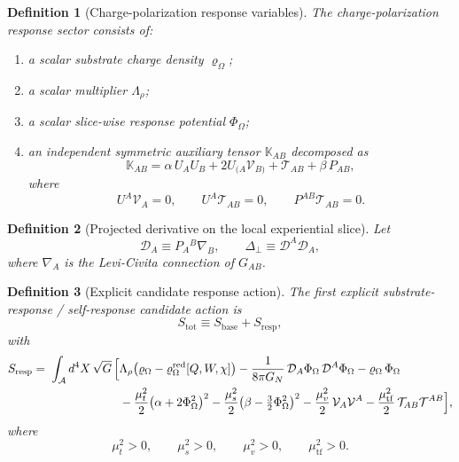\documentclass[11pt]{article}
\newcommand{\Sub}{\mathcal A}
\newcommand{\ProjSub}{P}
\newcommand{\SpatialD}{\mathcal D}
\newcommand{\LapPerp}{\Delta_\perp}
\newcommand{\AuxPol}{\mathbb K}
\newcommand{\FlowPot}{\Phi_\Omega}
\newcommand{\SourceDensity}{\varrho_\Omega}
\newcommand{\SourceDensityRed}{\varrho_\Omega^{\mathrm{red}}}
\newcommand{\SourceMult}{\Lambda_\rho}
\newcommand{\ResponseAction}{S_{\mathrm{resp}}}
\newcommand{\BaseAction}{S_{\mathrm{base}}}
\newcommand{\TotalAction}{S_{\mathrm{tot}}}
\newtheorem{definition}{Definition}
\begin{document}
\begin{definition}[Charge-polarization response variables]
\label{def:variables}
The \emph{charge-polarization response sector} consists of:
\begin{enumerate}
    \item a scalar substrate charge density \(\SourceDensity\);
    \item a scalar multiplier \(\SourceMult\);
    \item a scalar slice-wise response potential \(\FlowPot\);
    \item an independent symmetric auxiliary tensor \(\AuxPol_{AB}\) decomposed as
    \begin{equation}
    \AuxPol_{AB}
    =
    \alpha\,U_AU_B
    +2U_{(A}\mathcal V_{B)}
    +\mathcal T_{AB}
    +\beta\,\ProjSub_{AB},
    \label{eq:Kdecomp}
    \end{equation}
    where
    \begin{equation}
    U^A\mathcal V_A=0,
    \qquad
    U^A\mathcal T_{AB}=0,
    \qquad
    \ProjSub^{AB}\mathcal T_{AB}=0.
    \label{eq:TVcond}
    \end{equation}
\end{enumerate}
\end{definition}

\begin{definition}[Projected derivative on the local experiential slice]
\label{def:derivatives}
Let
\begin{equation}
\SpatialD_A\equiv \ProjSub_A{}^B\nabla_B,
\qquad
\LapPerp\equiv \SpatialD^A\SpatialD_A,
\label{eq:projderiv}
\end{equation}
where \(\nabla_A\) is the Levi-Civita connection of \(G_{AB}\).
\end{definition}

\begin{definition}[Explicit candidate response action]
\label{def:action}
The \emph{first explicit substrate-response / self-response candidate action} is
\begin{equation}
\TotalAction
\equiv
\BaseAction
+\ResponseAction,
\label{eq:Stot}
\end{equation}
with
\begin{align}
\ResponseAction
=\;
\int_{\Sub} d^4X\,\sqrt{G}\,
\Bigl[
&\SourceMult\bigl(\SourceDensity-\SourceDensityRed[Q,W,\chi]\bigr)
-\frac{1}{8\pi G_N}\,\SpatialD_A\FlowPot\,\SpatialD^A\FlowPot
-\SourceDensity\,\FlowPot
\nonumber\\
&-\frac{\mu_t^2}{2}\bigl(\alpha+2\FlowPot^2\bigr)^2
-\frac{\mu_s^2}{2}\bigl(\beta-\tfrac32\FlowPot^2\bigr)^2
-\frac{\mu_v^2}{2}\,\mathcal V_A\mathcal V^A
-\frac{\mu_{\mathrm{tf}}^2}{2}\,\mathcal T_{AB}\mathcal T^{AB}
\Bigr],
\label{eq:Sresp}
\end{align}
where
\begin{equation}
\mu_t^2>0,
\qquad
\mu_s^2>0,
\qquad
\mu_v^2>0,
\qquad
\mu_{\mathrm{tf}}^2>0.
\label{eq:masses}
\end{equation}
\end{definition}
\end{document}
